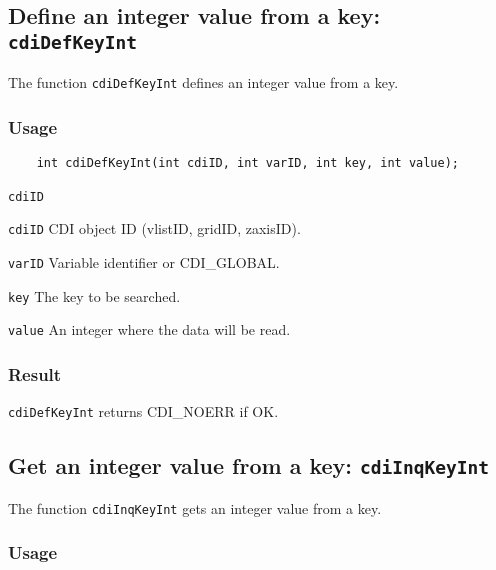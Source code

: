 \subsection{Define an integer value from a key: \texttt{cdiDefKeyInt}}
\label{cdiDefKeyInt}

The function {\texttt{cdiDefKeyInt}} defines an integer value from a key.

\subsubsection*{Usage}

\begin{verbatim}
    int cdiDefKeyInt(int cdiID, int varID, int key, int value);
\end{verbatim}

\hspace*{4mm}\begin{minipage}[]{15cm}
\begin{deflist}{\texttt{cdiID}\ }
\item[\texttt{cdiID}]
CDI object ID (vlistID, gridID, zaxisID).
\item[\texttt{varID}]
Variable identifier or CDI\_GLOBAL.
\item[\texttt{key}]
The key to be searched.
\item[\texttt{value}]
An integer where the data will be read.

\end{deflist}
\end{minipage}

\subsubsection*{Result}

{\texttt{cdiDefKeyInt}} returns CDI\_NOERR if OK.



\subsection{Get an integer value from a key: \texttt{cdiInqKeyInt}}
\label{cdiInqKeyInt}

The function {\texttt{cdiInqKeyInt}} gets an integer value from a key.

\subsubsection*{Usage}


